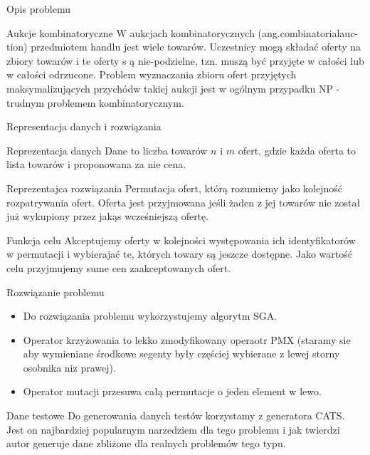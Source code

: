\begin{frame}{Opis problemu}
    \begin{block}{Aukcje kombinatoryczne}
        W aukcjach kombinatorycznych (ang.combinatorialauc-tion) przedmiotem handlu jest wiele towarów. Uczestnicy mogą składać oferty na zbiory towarów i te oferty s ą nie-podzielne, tzn. muszą być przyjęte w całości lub w całości odrzucone. Problem wyznaczania zbioru ofert przyjętych maksymalizujących przychódw takiej aukcji jest w ogólnym przypadku NP -trudnym problemem kombinatorycznym.
    \end{block}
\end{frame}

\begin{frame}{Representacja danych i rozwiązania}

    \begin{block}{Reprezentacja danych}
        Dane to liczba towarów $n$ i $m$ ofert, gdzie każda oferta to lista towarów i proponowana za nie cena.
    \end{block}

    \begin{block}{Reprezentajca rozwiązania}
        Permutacja ofert, którą rozumiemy jako kolejność rozpatrywania ofert.
        Oferta jest przyjmowana jeśli żaden z jej towarów nie został już wykupiony przez jakąs wcześniejszą ofertę.
    \end{block}

    \begin{block}{Funkcja celu}
        Akceptujemy oferty w kolejności występowania ich identyfikatorów w permutacji i wybierajać te, których towary są jeszcze dostępne.
        Jako wartość celu przyjmujemy sume cen zaakceptowanych ofert.
    \end{block}
\end{frame}

\begin{frame}{Rozwiązanie problemu}
    \begin{itemize}
        \item Do rozwiązania problemu wykorzystujemy algorytm SGA.
        \item Operator krzyżowania to lekko zmodyfikowany operaotr PMX (staramy sie aby wymieniane środkowe segenty były częściej wybierane z lewej storny osobnika niz prawej).
        \item Operator mutacji przesuwa całą permutacje o jeden element w lewo.
    \end{itemize}
\end{frame}

\begin{frame}{Dane testowe}
    Do generowania danych testów korzystamy z generatora CATS. Jest on najbardziej popularnym narzedziem dla tego problemu i jak twierdzi autor generuje dane zbliżone dla realnych problemów tego typu.
\end{frame}


